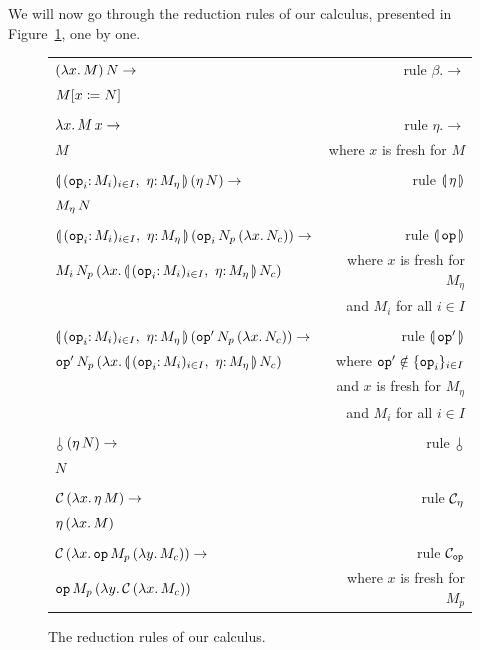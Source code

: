 We will now go through the reduction rules of our calculus, presented in
Figure~\ref{fig:reductions}, one by one.


\begin{figure}
  \centering
  \begin{tabular}{lr}
  $(\lambda x.\, M)\,N \to$ & rule $\beta.\to$ \\
  $M[x \coloneqq N]$ & \\
  \\
  $\lambda x.\, M\,x \to$ & rule $\eta.\to$ \\
  $M$ & where $x$ is fresh for $M$ \\
  \\
  $\ap{\cibanana}{(\ap{\eta}{N})} \to$ & rule $\llparenthesis \, \eta \, \rrparenthesis$ \\
  $M_\eta\,N$ & \\
  \\
  $\ap{\cibanana}{(\ap{\ap{\op{op}_i}{N_p}}{(\lam{x}{N_c})})} \to$ & rule $\llparenthesis \, \mathtt{op} \, \rrparenthesis$ \\
  $\ap{M_i}{\ap{N_p}{(\lam{x}{\ap{\cibanana}{N_c}})}}$
  & where $x$ is fresh for $M_\eta$ \\ & and $M_i$ for all $i \in I$ \\
  \\
  $\ap{\cibanana}{(\ap{\ap{\op{op}'}{N_p}}{(\lam{x}{N_c})})} \to$ & rule $\llparenthesis \, \mathtt{op}' \, \rrparenthesis$ \\
  $\ap{\op{op}'}{\ap{N_p}{(\lam{x}{\ap{\cibanana}{N_c}})}}$
  & where $\mathtt{op}' \notin \{\mathtt{op}_i\}_{i \in I}$ \\
  & and $x$ is fresh for $M_\eta$ \\ & and $M_i$ for all $i \in I$ \\
  \\
  $\ap{\cherry}{(\ap{\eta}{N})} \to$ & rule $\cherry$ \\
  $N$ & \\
  \\
  $\mathcal{C}\,(\lambda x.\, \eta\,M) \to$ & rule $\mathcal{C}_\eta$ \\
  $\eta\,(\lambda x.\, M)$ & \\
  \\
  $\mathcal{C}\,(\lambda x.\, \mathtt{op}\,M_p\,(\lambda y.\, M_c)) \to$ & rule $\mathcal{C}_{\mathtt{op}}$ \\
  $\mathtt{op}\,M_p\,(\lambda y.\, \mathcal{C}\,(\lambda x.\, M_c))$
  & where $x$ is fresh for $M_p$
  \end{tabular}
  
  \caption{\label{fig:reductions} The reduction rules of our
    calculus. }
\end{figure}


